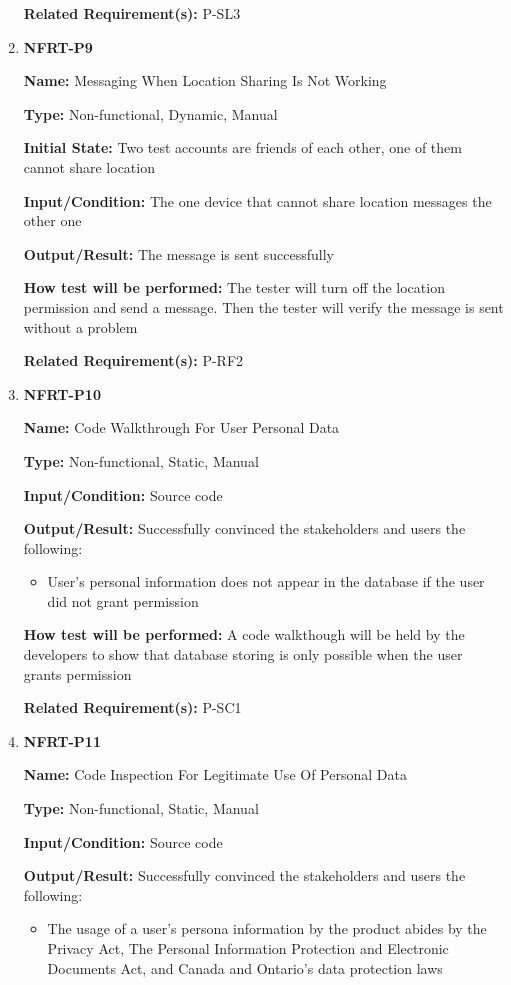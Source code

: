 \documentclass[12pt, titlepage]{article}
\begin{document}
\begin{enumerate}
\textbf{Related Requirement(s):} P-SL3

\item{\textbf{NFRT-P9}}

\textbf{Name:} Messaging When Location Sharing Is Not Working

\textbf{Type:} Non-functional, Dynamic, Manual
					
\textbf{Initial State:} Two test accounts are friends of each other, one of them cannot share location

\textbf{Input/Condition:} The one device that cannot share location messages the other one

\textbf{Output/Result:} The message is sent successfully

\textbf{How test will be performed:} The tester will turn off the location permission and send a message. Then the tester will verify the message is sent without a problem

\textbf{Related Requirement(s):} P-RF2

\item{\textbf{NFRT-P10}}

\textbf{Name:} Code Walkthrough For User Personal Data

\textbf{Type:} Non-functional, Static, Manual

\textbf{Input/Condition:} Source code

\textbf{Output/Result:} Successfully convinced the stakeholders and users the following:
\begin{itemize}
  \item User's personal information does not appear in the database if the user did not grant permission
\end{itemize}

\textbf{How test will be performed:} A code walkthough will be held by the developers to show that database storing is only possible when the user grants permission

\textbf{Related Requirement(s):} P-SC1

\item{\textbf{NFRT-P11}}

\textbf{Name:} Code Inspection For Legitimate Use Of Personal Data

\textbf{Type:} Non-functional, Static, Manual

\textbf{Input/Condition:} Source code

\textbf{Output/Result:} Successfully convinced the stakeholders and users the following:
\begin{itemize}
  \item The usage of a user's persona information by the product abides by the Privacy Act, The Personal Information Protection and Electronic Documents Act, and Canada and Ontario's data protection laws
\end{itemize}


\end{enumerate}
\end{document}
